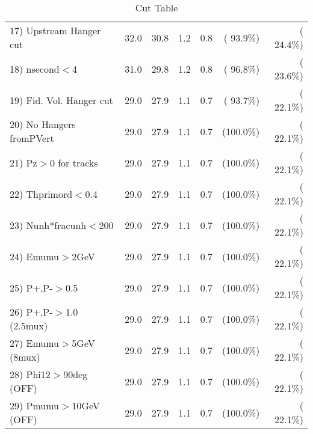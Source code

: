 \begin{table}[h!]
\begin{tabular}{||l||r|r|r|r|r|r||}
 17) Upstream Hanger cut  &         32.0 &         30.8 &          1.2 &          0.8 & ( 93.9\%) & ( 24.4\%) \\
 18) nsecond$<$4          &         31.0 &         29.8 &          1.2 &          0.8 & ( 96.8\%) & ( 23.6\%) \\
 19) Fid. Vol. Hanger cut &         29.0 &         27.9 &          1.1 &          0.7 & ( 93.7\%) & ( 22.1\%) \\
 20) No Hangers fromPVert &         29.0 &         27.9 &          1.1 &          0.7 & (100.0\%) & ( 22.1\%) \\
 21) Pz$>$0 for tracks    &         29.0 &         27.9 &          1.1 &          0.7 & (100.0\%) & ( 22.1\%) \\
 22) Thprimord$<$0.4      &         29.0 &         27.9 &          1.1 &          0.7 & (100.0\%) & ( 22.1\%) \\
 23) Nunh*fracunh$<$200   &         29.0 &         27.9 &          1.1 &          0.7 & (100.0\%) & ( 22.1\%) \\
 24) Emumu$>$2GeV         &         29.0 &         27.9 &          1.1 &          0.7 & (100.0\%) & ( 22.1\%) \\
 25) P+,P-$>$0.5          &         29.0 &         27.9 &          1.1 &          0.7 & (100.0\%) & ( 22.1\%) \\
 26) P+,P-$>$1.0 (2.5mux) &         29.0 &         27.9 &          1.1 &          0.7 & (100.0\%) & ( 22.1\%) \\
 27) Emumu$>$5GeV  (8mux) &         29.0 &         27.9 &          1.1 &          0.7 & (100.0\%) & ( 22.1\%) \\
 28) Phi12$>$90deg  (OFF) &         29.0 &         27.9 &          1.1 &          0.7 & (100.0\%) & ( 22.1\%) \\
 29) Pmumu$>$10GeV  (OFF) &         29.0 &         27.9 &          1.1 &          0.7 & (100.0\%) & ( 22.1\%) \\
 \hline
 \hline
 \end{tabular}
 \caption{Cut Table           }
 \label{tab-cutcohjpsi-mumu_cohrho0}
 \end{table}
